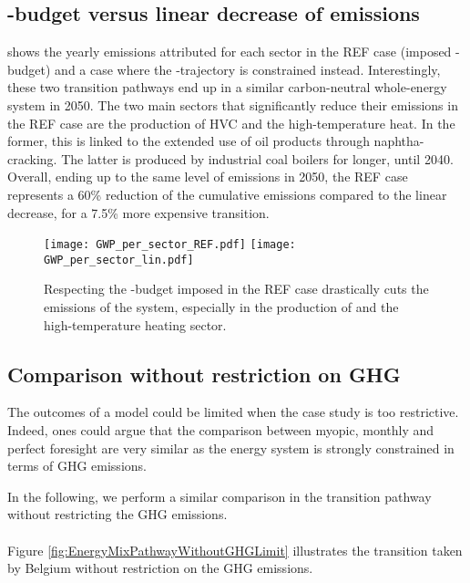 \subsection{-budget versus linear decrease of emissions}
\label{app:CO2_budget}

 shows the yearly emissions attributed for each sector in the REF case (\ie imposed -budget) and a case where the -trajectory is constrained instead. Interestingly, these two transition pathways end up in a similar carbon-neutral whole-energy system in 2050. The two main sectors that significantly reduce their emissions in the REF case are the production of \gls{HVC} and the high-temperature heat. In the former, this is linked to the extended use of oil products through naphtha-cracking. The latter is produced by industrial coal boilers for longer, until 2040. Overall, ending up to the same level of emissions in 2050, the REF case represents a 60\% reduction of the cumulative emissions compared to the linear decrease, for a 7.5\% more expensive transition.

\begin{figure}[htbp!]
\centering
\texttt{[image: GWP\_per\_sector\_REF.pdf]}
\texttt{[image: GWP\_per\_sector\_lin.pdf]}
\caption{Respecting the -budget imposed in the REF case drastically cuts the emissions of the system, especially in the production of  and the high-temperature heating sector.}
\label{fig:app_CO2_REF_lin}
\end{figure}

\subsection{Comparison without restriction on \gls{GHG}}
\label{app:pfmomy_comparison_without_GHG}

The outcomes of a model could be limited when the case study is too restrictive. Indeed, ones could argue that the comparison between myopic, monthly and perfect foresight are very similar as the energy system is strongly constrained in terms of \gls{GHG} emissions.

In the following, we perform a similar comparison in the transition pathway without restricting the \gls{GHG} emissions. \\

\\

\noindent
Figure \ref{fig:EnergyMixPathwayWithoutGHGLimit} illustrates the transition taken by Belgium without restriction on the \gls{GHG} emissions. 

